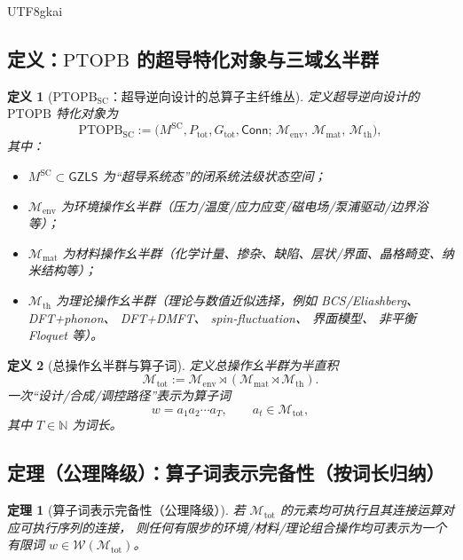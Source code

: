 \documentclass[12pt]{article}
\newtheorem{definition}{定义}[section]
\newtheorem{theorem}{定理}[section]
\newcommand{\GZLS}{\ensuremath{\mathsf{GZLS}}}
\newcommand{\PTOPB}{\ensuremath{\mathrm{PTOPB}}}
\newcommand{\Conn}{\ensuremath{\mathsf{Conn}}}
\begin{document}
\begin{CJK*}{UTF8}{gkai}
\subsection{定义：\PTOPB{} 的超导特化对象与三域幺半群}

\begin{definition}[\PTOPB$_{\mathrm{SC}}$：超导逆向设计的总算子主纤维丛]
\label{def:ptopb-sc}
定义超导逆向设计的 \PTOPB{} 特化对象为
\[
  \PTOPB_{\mathrm{SC}}
  :=
  \bigl(
    M^{\mathrm{SC}},
    P_{\mathrm{tot}},
    G_{\mathrm{tot}},
    \Conn;\,
    \mathcal{M}_{\mathrm{env}},\,
    \mathcal{M}_{\mathrm{mat}},\,
    \mathcal{M}_{\mathrm{th}}
  \bigr),
\]
其中：
\begin{itemize}
  \item $M^{\mathrm{SC}}\subset \GZLS$ 为“超导系统态”的闭系统法级状态空间；
  \item $\mathcal{M}_{\mathrm{env}}$ 为环境操作幺半群（压力/温度/应力应变/磁电场/泵浦驱动/边界浴等）；
  \item $\mathcal{M}_{\mathrm{mat}}$ 为材料操作幺半群（化学计量、掺杂、缺陷、层状/界面、晶格畸变、纳米结构等）；
  \item $\mathcal{M}_{\mathrm{th}}$ 为理论操作幺半群（理论与数值近似选择，例如
  BCS/\allowbreak Eliashberg、 DFT+\allowbreak phonon、 DFT+\allowbreak DMFT、
  spin-\allowbreak fluctuation、 界面模型、 非平衡 Floquet 等）。
\end{itemize}
\end{definition}

\begin{definition}[总操作幺半群与算子词]
\label{def:ptopb-sc-word}
定义总操作幺半群为半直积
\[
\mathcal{M}_{\mathrm{tot}}
:=
\mathcal{M}_{\mathrm{env}}\rtimes(\mathcal{M}_{\mathrm{mat}}\rtimes \mathcal{M}_{\mathrm{th}}).
\]
一次“设计/合成/调控路径”表示为算子词
\[
w = a_1 a_2 \cdots a_T,\qquad a_t\in \mathcal{M}_{\mathrm{tot}},
\]
其中 $T\in\mathbb{N}$ 为词长。
\end{definition}

\subsection{定理（公理降级）：算子词表示完备性（按词长归纳）}

\begin{theorem}[算子词表示完备性（公理降级）]
\label{thm:ptopb-sc-word-completeness}
若 $\mathcal{M}_{\mathrm{tot}}$ 的元素均可执行且其连接运算对应可执行序列的连接，
则任何有限步的环境/材料/理论组合操作均可表示为一个有限词 $w\in \mathcal{W}(\mathcal{M}_{\mathrm{tot}})$。
\end{theorem}


\end{CJK*}
\end{document}
